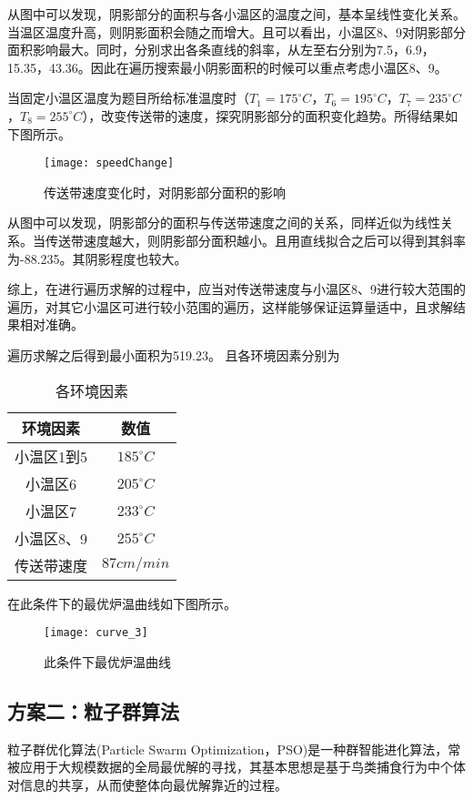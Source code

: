 \documentclass[withoutpreface,bwprint]{cumcmthesis} %
\begin{document}
从图中可以发现，阴影部分的面积与各小温区的温度之间，基本呈线性变化关系。当温区温度升高，则阴影面积会随之而增大。且可以看出，小温区8、9对阴影部分面积影响最大。同时，分别求出各条直线的斜率，从左至右分别为7.5，6.9，15.35，43.36。因此在遍历搜索最小阴影面积的时候可以重点考虑小温区8、9。

当固定小温区温度为题目所给标准温度时（$T_1=175^{\circ}C$，$T_6=195^{\circ}C$，$T_7=235^{\circ}C$，$T_8=255^{\circ}C$），改变传送带的速度，探究阴影部分的面积变化趋势。所得结果如下图所示。
\begin{figure}[!h]
	\centering
	\texttt{[image: speedChange]}
	\caption{传送带速度变化时，对阴影部分面积的影响}
	\label{fig:spC}
\end{figure}

从图中可以发现，阴影部分的面积与传送带速度之间的关系，同样近似为线性关系。当传送带速度越大，则阴影部分面积越小。且用直线拟合之后可以得到其斜率为-88.235。其阴影程度也较大。

综上，在进行遍历求解的过程中，应当对传送带速度与小温区8、9进行较大范围的遍历，对其它小温区可进行较小范围的遍历，这样能够保证运算量适中，且求解结果相对准确。

遍历求解之后得到最小面积为519.23。
且各环境因素分别为
\begin{table}[!htb]
	\centering
	\caption{各环境因素}
	\begin{tabular}{cc}
		\toprule[1.5pt]
		环境因素 & 数值\\
		\midrule[1pt]
		小温区1到5 & $185^{\circ}C$\\
		小温区6 & $205^{\circ}C$\\
		小温区7 & $233^{\circ}C$\\
		小温区8、9 & $255^{\circ}C$\\
		传送带速度 & $87cm/min$\\
		\bottomrule[1.5pt]
	\end{tabular}
\end{table}

在此条件下的最优炉温曲线如下图所示。
\begin{figure}[!h]
	\centering
	\texttt{[image: curve\_3]}
	\caption{此条件下最优炉温曲线}
	\label{fig:cur3}
\end{figure}

\newpage

\subsection{方案二：粒子群算法}
粒子群优化算法(Particle Swarm Optimization，PSO)是一种群智能进化算法，常被应用于大规模数据的全局最优解的寻找，其基本思想是基于鸟类捕食行为中个体对信息的共享，从而使整体向最优解靠近的过程。
\end{document}
